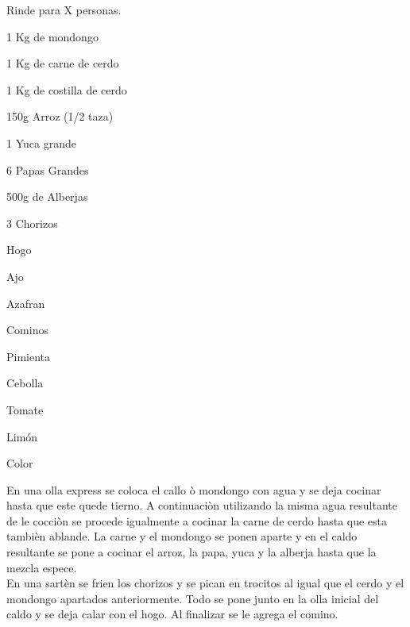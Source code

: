 
Rinde para X personas.

\begin{ingredientes}
\item 1 Kg de mondongo
\item 1 Kg de carne de cerdo
\item 1 Kg de costilla de cerdo
\item 150g Arroz (1/2 taza)
\item 1 Yuca grande
\item 6 Papas Grandes
\item 500g de Alberjas
\item 3 Chorizos
\item Hogo
\item Ajo
\item Azafran
\item Cominos
\item Pimienta
\item Cebolla
\item Tomate
\item Limón
\item Color
\item 
\end{ingredientes}
\preparacion
En una olla express se coloca el callo ò mondongo con agua y se deja cocinar hasta que este quede tierno. A continuaciòn utilizando la misma agua resultante de le cocciòn se procede igualmente a cocinar la carne de cerdo hasta que esta tambièn ablande. La carne y el mondongo se ponen aparte y en el caldo resultante se pone a cocinar el arroz, la papa, yuca y la alberja hasta que la mezcla espece.\\

En una sartèn se frien los chorizos y se pican en trocitos al igual que el cerdo y el mondongo apartados anteriormente. Todo se pone junto en la olla inicial del caldo y se deja calar con el hogo. Al finalizar se le agrega el comino.